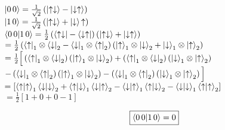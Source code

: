 \documentclass[12pt]{article}
\begin{document}
$\ket{0 \, 0} = \frac{1}{\sqrt{2}}\left(\ket{\uparrow\downarrow} - \ket{\downarrow\uparrow}\right)$\vspace{0.5em}\\
$\ket{1 \, 0} = \frac{1}{\sqrt{2}}\left(\ket{\uparrow\downarrow} + \ket{\downarrow}{\uparrow}\right)$\vspace{1.5em}\\
$\braket{0 \, 0}{1 \, 0} = \frac{1}{2} \left(\bra{\uparrow\downarrow} - \bra{\downarrow\uparrow}\right)\left(\ket{\uparrow \downarrow} + \ket{\downarrow\uparrow}\right)$\vspace{0.5em}\\
\hspace*{3.4em} $= \frac{1}{2}\left(\bra{\uparrow}_1 \otimes \bra{\downarrow}_2 - \bra{\downarrow}_1 \otimes \bra{\uparrow}_2\right)\left(\ket{\uparrow}_1 \otimes \ket{\downarrow}_2 + \ket{\downarrow}_1 \otimes \ket{\uparrow}_2\right)$\vspace{0.5em}\\
\hspace*{3.4em} $= \frac{1}{2}\Big[\left(\bra{\uparrow}_1 \otimes \bra{\downarrow}_2\right)\left(\ket{\uparrow}_1 \otimes \ket{\downarrow}_2\right) + \left(\bra{\uparrow}_1 \otimes \bra{\downarrow}_2\right)\left(\ket{\downarrow}_1 \otimes \ket{\uparrow}_2\right)$\vspace{0.5em}\\
\hspace*{5.4em} $ - \left(\bra{\downarrow}_1 \otimes \bra{\uparrow}_2\right)\left(\ket{\uparrow}_1 \otimes \ket{\downarrow}_2\right) - \left(\bra{\downarrow}_1 \otimes \bra{\uparrow}_2\right)\left(\ket{\downarrow}_1 \otimes \ket{\uparrow}_2\right)\Big]$\vspace{0.5em}\\ 
\hspace*{3.4em} $= \left[\braket{\uparrow}{\uparrow}_1\braket{\downarrow}{\downarrow}_2 + \braket{\uparrow}{\downarrow}_1\braket{\downarrow}{\uparrow}_2 - \braket{\downarrow}{\uparrow}_1\braket{\uparrow}{\downarrow}_2 - \braket{\downarrow}{\downarrow}_1\braket{\uparrow}{\uparrow}_2 \right]$\vspace{0.5em}\\ 
\hspace*{3.4em} $ = \frac{1}{2}\left[1 + 0 + 0 -1\right]$

\[\boxed{\braket{0 \,  0}{1 \, 0} = 0}\]

\newpage
\end{document}
